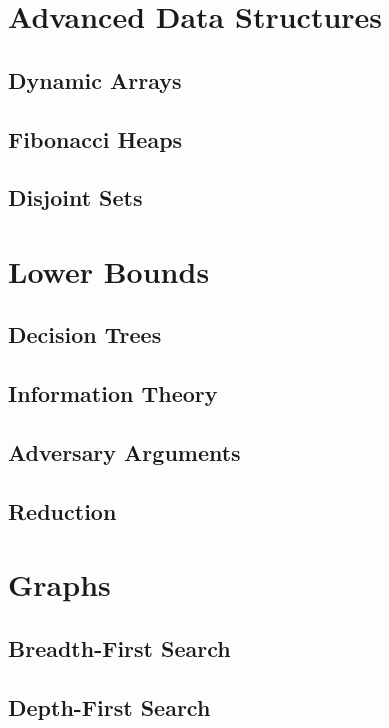 \documentclass[11pt,fleqn,dvipsnames]{book} %
\begin{document}
\part{Advanced Data Structures}

\chapter{Dynamic Arrays}

\chapter{Fibonacci Heaps}

\chapter{Disjoint Sets}


\part{Lower Bounds}

\chapter{Decision Trees}


\chapter{Information Theory}

\chapter{Adversary Arguments}

\chapter{Reduction}


\part{Graphs}

\chapter{Breadth-First Search}


\chapter{Depth-First Search}
\end{document}
